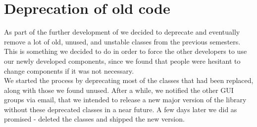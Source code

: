 
\section{Deprecation of old code}
\label{sec:deprecation_of_old_code}

As part of the further development of \gc we decided to deprecate and eventually remove a lot of old, unused, and unstable classes from the previous semesters. This is something we decided to do in order to force the other developers to use our newly developed components, since we found that people were hesitant to change components if it was not necessary.\\

We started the process by deprecating most of the classes that had been replaced, along with those we found unused. After a while, we notified the other GUI groups via email, that we intended to release a new major version of the \gc library without these deprecated classes in a near future. A few days later we did as promised - deleted the classes and shipped the new version. 